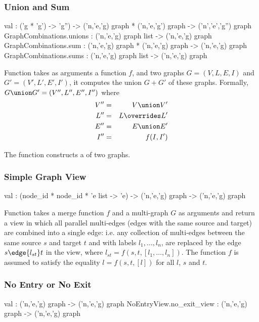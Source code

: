 \subsubsection{Union and Sum}
\begin{SML}
   val  : ('g * 'g') -> 'g'') ->
      ('n,'e,'g) graph * ('n,'e,'g') graph -> ('n','e','g'') graph
   GraphCombinations.unions : ('n,'e,'g) graph list -> ('n,'e,'g) graph
   GraphCombinations.sum : ('n,'e,'g) graph * ('n,'e,'g) graph -> ('n,'e,'g) graph
   GraphCombinations.sums : ('n,'e,'g) graph list -> ('n,'e,'g) graph
\end{SML}

Function  takes as arguments
a function $f$, and two graphs
$G=(V,L,E,I)$ and $G'=(V',L',E',I')$, it computes the union $G+G'$ of
these graphs.  Formally, $G \union G'=(V'',L'',E'',I'')$ where
\begin{eqnarray*}
   V'' & = & V \union V' \\
   L'' & = & L \overrides L' \\
   E'' & = & E \union E' \\
   I'' & = & f(I,I')
\end{eqnarray*}

The function  constructs a  of two
graphs.
\subsubsection{Simple Graph View}
\begin{SML}
  val  : (node_id * node_id * 'e list -> 'e) ->
   ('n,'e,'g) graph -> ('n,'e,'g) graph
\end{SML}
  Function  takes a merge function $f$ 
  and a multi-graph $G$ as arguments and return a view in which
  all parallel multi-edges (edges with the same source and target) are combined
  into a single edge: i.e. any collection of multi-edges between
  the same source $s$ and target $t$ and with labels $l_1,\ldots,l_n$, 
  are replaced by the edge $s \edge{l_{st}} t$ in the view, where
  $l_{st} = f(s,t,[l_1,\ldots,l_n])$.  The function $f$ is assumed
  to satisfy the equality $l = f(s,t,[l])$ for all $l$, $s$ and $t$.

\subsubsection{No Entry or No Exit} 
\begin{SML}
  val  : ('n,'e,'g) graph -> ('n,'e,'g) graph
  NoEntryView.no_exit_view : ('n,'e,'g) graph -> ('n,'e,'g) graph
\end{SML}

